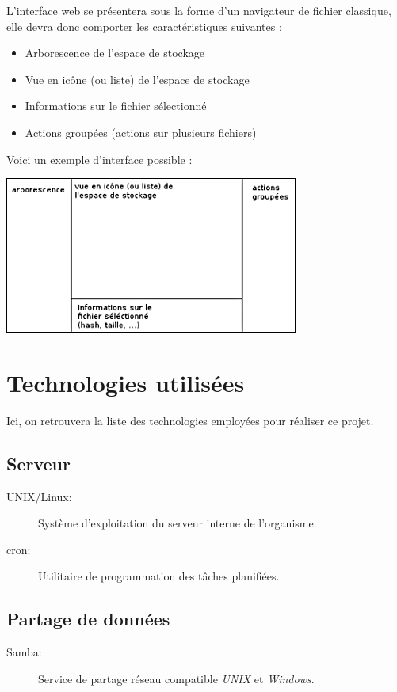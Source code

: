 L'interface web se présentera sous la forme d'un navigateur de fichier classique, elle devra donc
comporter les caractéristiques suivantes :

\begin{itemize}
     \item Arborescence de l'espace de stockage
     \item Vue en icône (ou liste) de l'espace de stockage
     \item Informations sur le fichier sélectionné
     \item Actions groupées (actions sur plusieurs fichiers)
\end{itemize}

Voici un exemple d'interface possible :

\includegraphics{schema02.png}

\section{Technologies utilisées}

Ici, on retrouvera la liste des technologies employées pour réaliser ce projet.

\subsection{Serveur}

\begin{description}
     \item[UNIX/Linux:] Système d'exploitation du serveur interne de l'organisme.
     \item[cron:] Utilitaire de programmation des tâches planifiées.
\end{description}

\subsection{Partage de données}

\begin{description}
     \item[Samba:] Service de partage réseau compatible \textit{UNIX} et \textit{Windows}.
\end{description}

